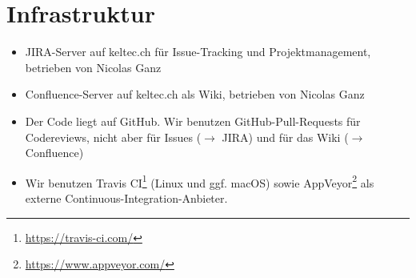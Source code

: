 \documentclass[a4paper]{article}
\let\oldsection\section
\renewcommand\section{\clearpage\oldsection}
\begin{document}
%
%
%
%

\section{Infrastruktur}
\begin{itemize}
  \item JIRA-Server auf keltec.ch für Issue-Tracking und Projektmanagement, betrieben von Nicolas Ganz
  \item Confluence-Server auf keltec.ch als Wiki, betrieben von Nicolas Ganz
  \item Der Code liegt auf GitHub.
    Wir benutzen GitHub-Pull-Requests für Codereviews, nicht aber für Issues ($\rightarrow$ JIRA)
    und für das Wiki ($\rightarrow$ Confluence)
  \item Wir benutzen Travis CI\footnote{\url{https://travis-ci.com/}} (Linux und
    ggf. macOS) sowie AppVeyor\footnote{\url{https://www.appveyor.com/}} als
    externe Continuous-Integration-Anbieter.
\end{itemize}
\end{document}
